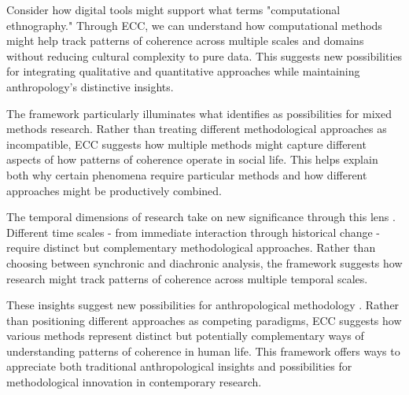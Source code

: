 Consider how digital tools might support what \cite{beaulieu2017vectors} terms "computational ethnography." Through ECC, we can understand how computational methods might help track patterns of coherence across multiple scales and domains without reducing cultural complexity to pure data. This suggests new possibilities for integrating qualitative and quantitative approaches while maintaining anthropology's distinctive insights.

The framework particularly illuminates what \cite{ladner2019mixed} identifies as possibilities for mixed methods research. Rather than treating different methodological approaches as incompatible, ECC suggests how multiple methods might capture different aspects of how patterns of coherence operate in social life. This helps explain both why certain phenomena require particular methods and how different approaches might be productively combined.

The temporal dimensions of research take on new significance through this lens \cite{marcus2012multi}. Different time scales - from immediate interaction through historical change - require distinct but complementary methodological approaches. Rather than choosing between synchronic and diachronic analysis, the framework suggests how research might track patterns of coherence across multiple temporal scales.

These insights suggest new possibilities for anthropological methodology \cite{strathern2004partial}. Rather than positioning different approaches as competing paradigms, ECC suggests how various methods represent distinct but potentially complementary ways of understanding patterns of coherence in human life. This framework offers ways to appreciate both traditional anthropological insights and possibilities for methodological innovation in contemporary research.
